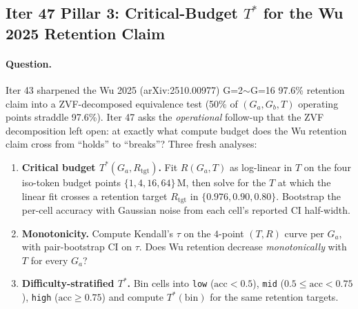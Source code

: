 \subsection{Iter 47 Pillar 3: Critical-Budget $T^*$ for the Wu 2025 Retention Claim}
\label{sec:group-size-iter47}

\paragraph{Question.}
Iter 43 sharpened the Wu 2025 (arXiv:2510.00977) G=2$\sim$G=16 97.6\%
retention claim into a ZVF-decomposed equivalence test (50\% of
$(G_a, G_b, T)$ operating points straddle 97.6\%). Iter 47 asks the
\emph{operational} follow-up that the ZVF decomposition left open: at
exactly what compute budget does the Wu retention claim cross from
``holds'' to ``breaks''?  Three fresh analyses:
\begin{enumerate}
  \item \textbf{Critical budget $T^*(G_a, R_{\text{tgt}})$.} Fit
        $R(G_a, T)$ as log-linear in $T$ on the four iso-token budget
        points $\{1, 4, 16, 64\}$\,M, then solve for the $T$ at which
        the linear fit crosses a retention target $R_{\text{tgt}}$ in
        $\{0.976, 0.90, 0.80\}$.  Bootstrap the per-cell accuracy with
        Gaussian noise from each cell's reported CI half-width.
  \item \textbf{Monotonicity.}  Compute Kendall's $\tau$ on the
        $4$-point $(T, R)$ curve per $G_a$, with pair-bootstrap CI on
        $\tau$.  Does Wu retention decrease \emph{monotonically} with
        $T$ for every $G_a$?
  \item \textbf{Difficulty-stratified $T^*$.}  Bin cells into
        \texttt{low} ($\text{acc}<0.5$), \texttt{mid}
        ($0.5\le\text{acc}<0.75$), \texttt{high} ($\text{acc}\ge
        0.75$) and compute $T^*(\text{bin})$ for the same retention
        targets.
\end{enumerate}


